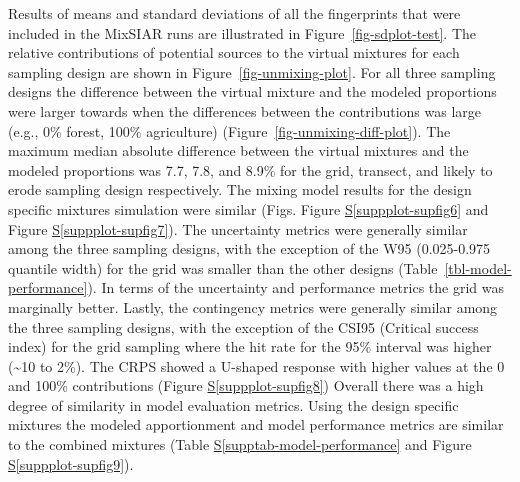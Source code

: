 \documentclass[
  number]{elsarticle}
\newcommand*\quartosuppplotref[1]{Figure \hyperref[#1]{S\ref{#1}}}
\newcommand*\quartosupptabref[1]{Table \hyperref[#1]{S\ref{#1}}}
\begin{document}
Results of means and standard deviations of all the fingerprints that
were included in the MixSIAR runs are illustrated in
Figure~\ref{fig-sdplot-test}. The relative contributions of potential
sources to the virtual mixtures for each sampling design are shown in
Figure~\ref{fig-unmixing-plot}. For all three sampling designs the
difference between the virtual mixture and the modeled proportions were
larger towards when the differences between the contributions was large
(e.g., 0\% forest, 100\% agriculture)
(Figure~\ref{fig-unmixing-diff-plot}). The maximum median absolute
difference between the virtual mixtures and the modeled proportions was
7.7, 7.8, and 8.9\% for the grid, transect, and likely to erode sampling
design respectively. The mixing model results for the design specific
mixtures simulation were similar (Figs.
\quartosuppplotref{suppplot-supfig6} and
\quartosuppplotref{suppplot-supfig7}). The uncertainty metrics were
generally similar among the three sampling designs, with the exception
of the W95 (0.025-0.975 quantile width) for the grid was smaller than
the other designs (Table~\ref{tbl-model-performance}). In terms of the
uncertainty and performance metrics the grid was marginally better.
Lastly, the contingency metrics were generally similar among the three
sampling designs, with the exception of the CSI95 (Critical success
index) for the grid sampling where the hit rate for the 95\% interval
was higher (\textasciitilde10 to 2\%). The CRPS showed a U-shaped
response with higher values at the 0 and 100\% contributions
(\quartosuppplotref{suppplot-supfig8}) Overall there was a high degree
of similarity in model evaluation metrics. Using the design specific
mixtures the modeled apportionment and model performance metrics are
similar to the combined mixtures
(\quartosupptabref{supptab-model-performance} and
\quartosuppplotref{suppplot-supfig9}).
\end{document}
